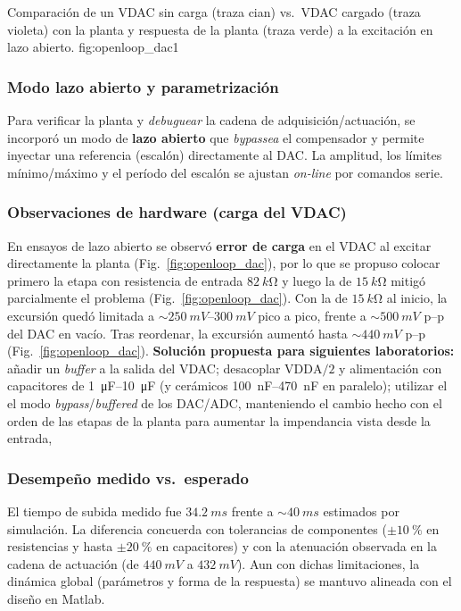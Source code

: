 {Comparación de un  VDAC sin carga (traza cian) vs.\ VDAC cargado (traza violeta) con la planta y respuesta de la planta (traza verde) a la excitación en lazo abierto.}
{fig:openloop_dac}{1}

\subsubsection{Modo lazo abierto y parametrización}
Para verificar la planta y \emph{debuguear} la cadena de adquisición/actuación, se incorporó un modo de \textbf{lazo abierto} que \emph{bypassea} el compensador y permite inyectar una referencia (escalón) directamente al DAC. La amplitud, los límites mínimo/máximo y el período del escalón se ajustan \emph{on-line} por comandos serie.

\subsubsection{Observaciones de hardware (carga del VDAC)}
En ensayos de lazo abierto se observó \textbf{error de carga} en el VDAC al excitar directamente la planta (Fig.~\ref{fig:openloop_dac}), por lo que se propuso colocar primero la etapa con resistencia de entrada \(\SI{82}{k\ohm}\) y luego la de \(\SI{15}{k\ohm}\) mitigó parcialmente el problema (Fig.~\ref{fig:openloop_dac}). Con la de \(\SI{15}{k\ohm}\) al inicio, la excursión quedó limitada a \(\sim\SI{250}{mV}\)–\(\SI{300}{mV}\) pico a pico, frente a \(\sim\SI{500}{mV}\) p–p del DAC en vacío. Tras reordenar, la excursión aumentó hasta \(\sim\SI{440}{mV}\) p–p (Fig.~\ref{fig:openloop_dac}).
\textbf{Solución propuesta para siguientes laboratorios:} añadir un \emph{buffer} a la salida del VDAC; desacoplar \(\mathrm{VDDA}/2\) y alimentación con capacitores de \SIrange{1}{10}{\micro\farad} (y cerámicos \SIrange{100}{470}{nF} en paralelo); utilizar el el modo \emph{bypass}/\emph{buffered} de los DAC/ADC, manteniendo el cambio hecho con el orden de las etapas de la planta para aumentar la impendancia vista desde la entrada,



\subsubsection{Desempeño medido vs.\ esperado}
El tiempo de subida medido fue \(\SI{34.2}{ms}\) frente a \(\sim\SI{40}{ms}\) estimados por simulación. La diferencia concuerda con tolerancias de componentes (\(\pm\SI{10}{\percent}\) en resistencias y hasta \(\pm\SI{20}{\percent}\) en capacitores) y con la atenuación observada en la cadena de actuación (de \(\SI{440}{mV}\) a \(\SI{432}{mV}\)). Aun con dichas limitaciones, la dinámica global (parámetros y forma de la respuesta) se mantuvo alineada con el diseño en Matlab.

